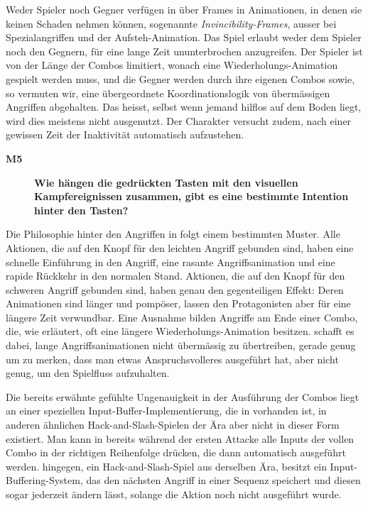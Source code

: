 \documentclass[../Main.tex]{subfiles}
\begin{document}
Weder Spieler noch Gegner verfügen in  über Frames in Animationen, in denen sie keinen Schaden nehmen können, sogenannte \textit{Invincibility-Frames}, ausser bei Spezialangriffen und der Aufsteh-Animation. Das Spiel erlaubt weder dem Spieler noch den Gegnern, für eine lange Zeit ununterbrochen anzugreifen. Der Spieler ist von der Länge der Combos limitiert, wonach eine Wiederholungs-Animation gespielt werden muss, und die Gegner werden durch ihre eigenen Combos sowie, so vermuten wir, eine übergeordnete Koordinationslogik von übermässigen Angriffen abgehalten. Das heisst, selbst wenn jemand hilflos auf dem Boden liegt, wird dies meistens nicht ausgenutzt. Der Charakter versucht zudem, nach einer gewissen Zeit der Inaktivität automatisch aufzustehen.

\begin{description}
  \item[\textbf{M5}] \textbf{Wie hängen die gedrückten Tasten mit den visuellen Kampfereignissen zusammen, gibt es eine bestimmte Intention hinter den Tasten?}
\end{description}

Die Philosophie hinter den Angriffen in  folgt einem bestimmten Muster. Alle Aktionen, die auf den Knopf für den leichten Angriff gebunden sind, haben eine schnelle Einführung in den Angriff, eine rasante Angriffsanimation und eine rapide Rückkehr in den normalen Stand. Aktionen, die auf den Knopf für den schweren Angriff gebunden sind, haben genau den gegenteiligen Effekt: Deren Animationen sind länger und pompöser, lassen den Protagonisten aber für eine längere Zeit verwundbar. Eine Ausnahme bilden Angriffe am Ende einer Combo, die, wie erläutert, oft eine längere Wiederholungs-Animation besitzen.  schafft es dabei, lange Angriffsanimationen nicht übermässig zu übertreiben, gerade genug um zu merken, dass man etwas Anspruchsvolleres ausgeführt hat, aber nicht genug, um den Spielfluss aufzuhalten.

Die bereits erwähnte gefühlte Ungenauigkeit in der Ausführung der Combos liegt an einer speziellen Input-Buffer-Implementierung, die in  vorhanden ist, in anderen ähnlichen Hack-and-Slash-Spielen der Ära aber nicht in dieser Form existiert. Man kann in  bereits während der ersten Attacke alle Inputs der vollen Combo in der richtigen Reihenfolge drücken, die dann automatisch ausgeführt werden.  hingegen, ein Hack-and-Slash-Spiel aus derselben Ära, besitzt ein Input-Buffering-System, das den nächsten Angriff in einer Sequenz speichert und diesen sogar jederzeit ändern lässt, solange die Aktion noch nicht ausgeführt wurde.\autocite{dmcwiki_inputbuffering}
\end{document}
